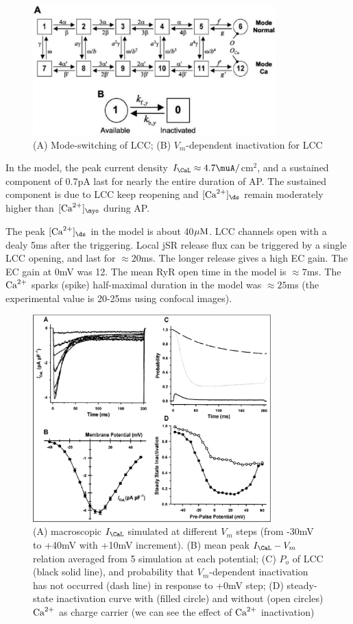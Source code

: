 \begin{figure}[hbt]
  \centerline{\includegraphics[height=5cm,
    angle=0]{./images/Greenstein_LCC.eps}}
  \caption{(A) Mode-switching of LCC; (B) $V_m$-dependent inactivation
    for LCC}
\label{fig:Greenstein_lCC}
\end{figure}

In the model, the peak current density $I_\CaL \approx 4.7 \muA/$cm$^2$, and a
sustained component of 0.7pA last for nearly the entire duration of AP. The
sustained component is due to LCC keep reopening and $[\Ca]_\ds$ remain
moderately higher than $[\Ca]_\myo$ during AP.

The peak $[\Ca]_\ds$ in the model is about 40${\mu\text{M}}$.
LCC channels open with a dealy 5ms after the triggering. Local jSR release flux
can be triggered by a single LCC opening, and last for $\approx 20$ms. The
longer release gives a high EC gain. The EC gain at 0mV was 12. The mean RyR
open time in the model is $\approx 7$ms. The ${\text{Ca}^{2+}}$ sparks (spike) half-maximal
duration in the model was $\approx 25$ms (the experimental value is 20-25ms
using confocal images).

\begin{figure}[hbt]
  \centerline{\includegraphics[height=8cm,
    angle=0]{./images/Greenstein_DHPRcurrent.eps}}
  \caption{ (A) macroscopic $I_\CaL$ simulated at different $V_m$ steps (from
  -30mV to +40mV with +10mV increment). (B) mean peak $I_\CaL-V_m$ relation
  averaged from 5 simulation at each potential; (C) $P_o$ of LCC (black solid
  line), and probability that $V_m$-dependent inactivation has not occurred
  (dash line) in response to +0mV step; (D) steady-state inactivation curve
  with (filled circle) and without (open circles) ${\text{Ca}^{2+}}$ as charge carrier (we
  can see the effect of ${\text{Ca}^{2+}}$ inactivation)}
\label{fig:Greenstein_DHPRcurrent}
\end{figure}

